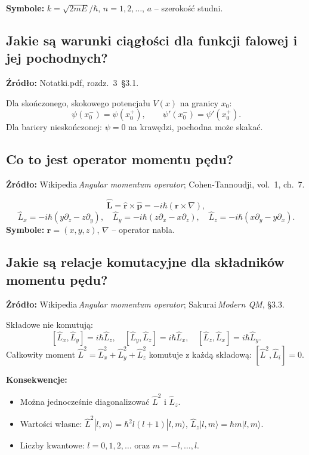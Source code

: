 		\textbf{Symbole:} $k=\sqrt{2mE}/\hbar$, $n=1,2,\dots$, $a$ – szerokość studni.

\subsection{Jakie są warunki ciągłości dla funkcji falowej i jej pochodnych?}

\textbf{Źródło:} Notatki.pdf, rozdz.~3~\S3.1.
		
		Dla skończonego, skokowego potencjału $V(x)$ na granicy $x_0$:
		\[
		\psi(x_0^-) = \psi(x_0^+),\qquad
		\psi'(x_0^-) = \psi'(x_0^+).
		\]
		Dla bariery nieskończonej: $\psi=0$ na krawędzi, pochodna może skakać.

\subsection{Co to jest operator momentu pędu?}

\textbf{Źródło:} Wikipedia\,\emph{Angular momentum operator}; Cohen-Tannoudji, vol.~1, ch.~7.
		
		\[
		\hat{\mathbf L}=\hat{\mathbf r}\times\hat{\mathbf p}=-i\hbar(\mathbf r\times\nabla),
		\]
		\[
		\hat L_x=-i\hbar(y\partial_z-z\partial_y),\quad
		\hat L_y=-i\hbar(z\partial_x-x\partial_z),\quad
		\hat L_z=-i\hbar(x\partial_y-y\partial_x).
		\]
		\textbf{Symbole:} $\mathbf r=(x,y,z)$, $\nabla$ – operator nabla.

\subsection{Jakie są relacje komutacyjne dla składników momentu pędu?}

\textbf{Źródło:} Wikipedia\,\emph{Angular momentum operator}; Sakurai\,\emph{Modern QM}, \S3.3.
		
		Składowe nie komutują:
		\[
		[\hat L_x,\hat L_y]=i\hbar\hat L_z,\quad
		[\hat L_y,\hat L_z]=i\hbar\hat L_x,\quad
		[\hat L_z,\hat L_x]=i\hbar\hat L_y.
		\]
		Całkowity moment
		\(
		\hat L^{2}=\hat L_x^{2}+\hat L_y^{2}+\hat L_z^{2}
		\)
		komutuje z każdą składową: $[\hat L^{2},\hat L_i]=0$.
		
		\textbf{Konsekwencje:}
		\begin{itemize}
			\item Można jednocześnie diagonalizować $\hat L^{2}$ i $\hat L_z$.
			\item Wartości własne: $\hat L^{2}|l,m\rangle=\hbar^{2}l(l+1)|l,m\rangle$, $\hat L_z|l,m\rangle=\hbar m|l,m\rangle$.
			\item Liczby kwantowe: $l=0,1,2,\dots$ oraz $m=-l,\dots,l$.
		\end{itemize}

